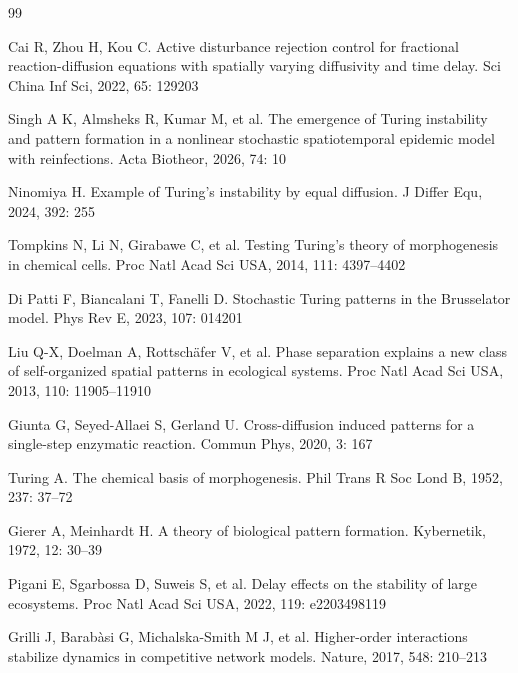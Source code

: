 \documentclass{SCIS2026}
\begin{document}
\begin{thebibliography}{99}

	Cai R, Zhou H, Kou C. Active disturbance rejection control for fractional reaction-diffusion equations with spatially varying diffusivity and time delay. Sci China Inf Sci, 2022, 65: 129203

	Singh A K, Almsheks R, Kumar M, et al. The emergence of Turing instability and pattern formation in a nonlinear stochastic spatiotemporal epidemic model with reinfections. Acta Biotheor, 2026, 74: 10

	Ninomiya H. Example of Turing's instability by equal diffusion. J Differ Equ, 2024, 392: 255

	Tompkins N, Li N, Girabawe C, et al. Testing Turing's theory of morphogenesis in chemical cells. Proc Natl Acad Sci USA, 2014, 111: 4397--4402

	Di Patti F, Biancalani T, Fanelli D. Stochastic Turing patterns in the Brusselator model. Phys Rev E, 2023, 107: 014201

	Liu Q-X, Doelman A, Rottsch\"afer V, et al. Phase separation explains a new class of self-organized spatial patterns in ecological systems. Proc Natl Acad Sci USA, 2013, 110: 11905--11910

	Giunta G, Seyed-Allaei S, Gerland U. Cross-diffusion induced patterns for a single-step enzymatic reaction. Commun Phys, 2020, 3: 167

	Turing A. The chemical basis of morphogenesis. Phil Trans R Soc Lond B, 1952, 237: 37--72

	Gierer A, Meinhardt H. A theory of biological pattern formation. Kybernetik, 1972, 12: 30--39

	Pigani E, Sgarbossa D, Suweis S, et al. Delay effects on the stability of large ecosystems. Proc Natl Acad Sci USA, 2022, 119: e2203498119

	Grilli J, Barab\`asi G, Michalska-Smith M J, et al. Higher-order interactions stabilize dynamics in competitive network models. Nature, 2017, 548: 210--213


\end{thebibliography}
\end{document}
